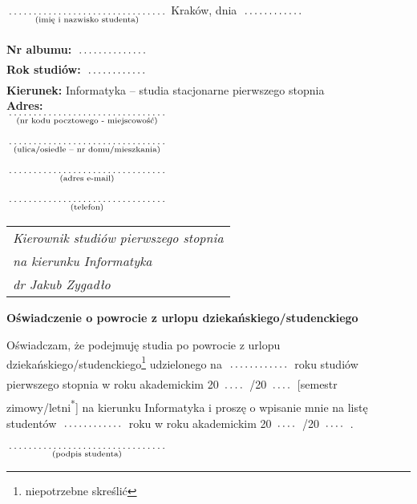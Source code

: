 \documentclass[a4paper,11pt]{article}
\newcommand{\fillField}[2]{
    $\underset{\text{#1}}{\parbox[t]{#2}{\dotfill}}$
}
\begin{document}
\noindent
\fillField{(imię i nazwisko studenta)}{5cm} \hfill Kraków, dnia \fillField{}{2cm} \\\\
\textbf{Nr albumu:}   \fillField{}{2.3cm}\\
\textbf{Rok studiów:} \fillField{}{2cm}\\
\textbf{Kierunek:} Informatyka -- studia stacjonarne pierwszego stopnia\\
\textbf{Adres:}\\
\fillField{(nr kodu pocztowego - miejscowość)}{5cm}\\\\
\fillField{(ulica/osiedle – nr domu/mieszkania)}{5cm}\\\\
\fillField{(adres e-mail)}{5cm}\\\\
\fillField{(telefon)}{5cm}


\phantom{a}\hfill
\begin{tabular}[c]{@{}l@{}}
\textit{Kierownik studiów pierwszego stopnia} \\
\textit{na kierunku Informatyka}\\
\textit{dr Jakub Zygadło}
\end{tabular}

\vskip 2.0cm

\begin{center}
{\Large \textbf{Oświadczenie o powrocie z urlopu dziekańskiego/studenckiego}}
\end{center}

\vskip 0.5cm

Oświadczam, że podejmuję studia po powrocie z urlopu dziekańskiego/studenckiego\footnote[1]{niepotrzebne skreślić} udzielonego na \fillField{}{2cm} roku studiów pierwszego stopnia w roku akademickim 20\fillField{}{0.7cm}/20\fillField{}{0.7cm} [semestr zimowy/letni\textsuperscript{*}] na kierunku Informatyka i proszę o wpisanie mnie na listę studentów \fillField{}{2cm} roku w roku akademickim 20\fillField{}{0.7cm}/20\fillField{}{0.7cm}.

\vskip 2.0cm

\hspace{\fill} \fillField{(podpis studenta)}{5cm} \hspace{2.0cm}
\end{document}
